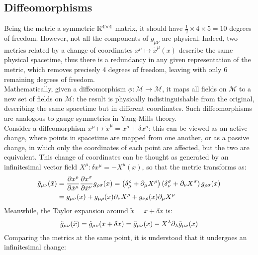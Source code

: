 \subsection{Diffeomorphisms}

Being the metric a symmetric $ \mathbb{R}^{4 \times 4} $ matrix, it should have $ \frac{1}{2} \times 4 \times 5 = 10 $ degrees of freedom. However, not all the components of $ g_{\mu \nu} $ are physical. Indeed, two metrics related by a change of coordinates $ x^\mu \mapsto \tilde{x}^\mu(x) $ describe the same physical spacetime, thus there is a redundancy in any given representation of the metric, which removes precisely 4 degrees of freedom, leaving with only 6 remaining degrees of freedom.\\
Mathematically, given a diffeomorphism $ \phi : \mathcal{M} \rightarrow \mathcal{M} $, it maps all fields on $ \mathcal{M} $ to a new set of fields on $ \mathcal{M} $: the result is physically indistinguishable from the original, describing the same spacetime but in different coordinates. Such diffeomorphisms are analogous to gauge symmetries in Yang-Mills theory.\\
Consider a diffeomorphism $ x^\mu \mapsto \tilde{x}^\mu = x^\mu + \delta x^\mu $: this can be viewed as an active change, where points in spacetime are mapped from one another, or as a passive change, in which only the coordinates of each point are affected, but the two are equivalent. This change of coordinates can be thought as generated by an infinitesimal vector field $ X^\mu : \delta x^\mu = - X^\mu (x) $, so that the metric transforms as:
\begin{equation*}
  \begin{split}
    \tilde{g}_{\mu \nu} (\tilde{x})
    &= \frac{\partial x^\rho}{\partial \tilde{x}^\mu} \frac{\partial x^\sigma}{\partial \tilde{x}^\nu} g_{\rho \sigma}(x) = \left( \delta^\rho_\mu + \partial_\mu X^\rho \right) \left( \delta^\sigma_\nu + \partial_\nu X^\sigma \right) g_{\rho \sigma}(x) \\
    &= g_{\mu \nu}(x) + g_{\mu \rho}(x) \partial_\nu X^\rho + g_{\nu \rho}(x) \partial_\mu X^\rho
  \end{split}
\end{equation*}
Meanwhile, the Taylor expansion around $ \tilde{x} = x + \delta x $ is:
\begin{equation*}
  \tilde{g}_{\mu \nu} (\tilde{x}) = \tilde{g}_{\mu \nu} (x + \delta x) = \tilde{g}_{\mu \nu}(x) - X^\lambda \partial_\lambda \tilde{g}_{\mu \nu}(x)
\end{equation*}
Comparing the metrics at the same point, it is understood that it undergoes an infinitesimal change:
